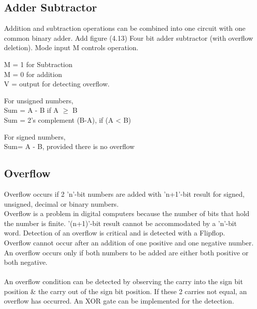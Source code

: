 \subsection{Adder Subtractor}
Addition and subtraction operations can be combined into one circuit with one common binary adder. 
Add figure (4.13)
Four bit adder subtractor (with overflow deletion). Mode input M controls operation. 

\par M = 1 for Subtraction \\
M = 0 for addition \\
V = output for detecting overflow.

\par For unsigned numbers,\\ 
Sum = A - B if A \(\geqslant\) B \\
Sum = 2's complement (B-A), if (A < B)\

\par For signed numbers,\\
Sum= A - B, provided there is no overflow 

\subsection{Overflow}
Overflow occurs if 2 'n'-bit numbers are added with 'n+1'-bit result for signed, unsigned, decimal or binary numbers.\\
Overflow is a problem in digital computers because the number of bits that hold the number is finite. '(n+1)'-bit result 
cannot be accommodated by a 'n'-bit word. Detection of an overflow is critical and is detected with a Flipflop.\\
Overflow cannot occur after an addition of one positive and one negative number. An overflow occurs only if both numbers to be added are either both positive or both negative.\\\\ 
An overflow condition can be detected by observing the carry into the sign bit position \& the carry out of the sign bit position. If these 2 carries not equal, an overflow has occurred. An XOR gate can be implemented for the detection. 

